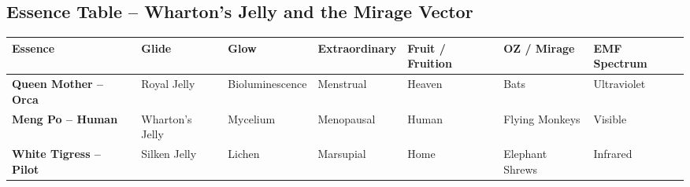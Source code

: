 \documentclass{article}
\begin{document}
\begin{landscape}

\section*{Essence Table – Wharton’s Jelly and the Mirage Vector}

\begin{tabularx}{\linewidth}{>{\raggedright\arraybackslash}p{4cm} 
                               >{\raggedright\arraybackslash}p{3.2cm} 
                               >{\raggedright\arraybackslash}p{3cm} 
                               >{\raggedright\arraybackslash}p{3.5cm} 
                               >{\raggedright\arraybackslash}p{3.5cm} 
                               >{\raggedright\arraybackslash}p{3.5cm} 
                               >{\raggedright\arraybackslash}p{3cm} }
\toprule
\textbf{Essence} & \textbf{Glide} & \textbf{Glow} & \textbf{Extraordinary} & \textbf{Fruit / Fruition} & \textbf{OZ / Mirage} & \textbf{EMF Spectrum} \\
\midrule
\textbf{Queen Mother – Orca} & Royal Jelly & Bioluminescence & Menstrual & Heaven & Bats & Ultraviolet \\
\textbf{Meng Po – Human} & Wharton’s Jelly & Mycelium & Menopausal & Human & Flying Monkeys & Visible \\
\textbf{White Tigress – Pilot} & Silken Jelly & Lichen & Marsupial & Home & Elephant Shrews & Infrared \\
\bottomrule
\end{tabularx}

\end{landscape}
\end{document}
